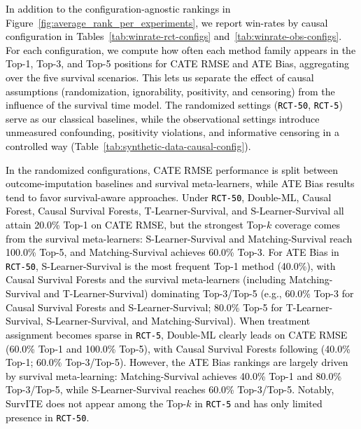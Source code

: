 \documentclass{article} %
\newcommand{\rebuttal}[1]{\textcolor{black}{#1}}
\begin{document}
\rebuttal{In addition to the configuration-agnostic rankings in Figure~\ref{fig:average_rank_per_experiments}, we report win-rates by causal configuration in Tables~\ref{tab:winrate-rct-configs} and~\ref{tab:winrate-obs-configs}. For each configuration, we compute how often each method family appears in the Top-1, Top-3, and Top-5 positions for CATE RMSE and ATE Bias, aggregating over the five survival scenarios. This lets us separate the effect of causal assumptions (randomization, ignorability, positivity, and censoring) from the influence of the survival time model. The randomized settings (\texttt{RCT-50}, \texttt{RCT-5}) serve as our classical baselines, while the observational settings introduce unmeasured confounding, positivity violations, and informative censoring in a controlled way (Table~\ref{tab:synthetic-data-causal-config}).}

\rebuttal{In the randomized configurations, CATE RMSE performance is split between outcome-imputation baselines and survival meta-learners, while ATE Bias results tend to favor survival-aware approaches. Under \texttt{RCT-50}, Double-ML, Causal Forest, Causal Survival Forests, T-Learner-Survival, and S-Learner-Survival all attain 20.0\% Top-1 on CATE RMSE, but the strongest Top-$k$ coverage comes from the survival meta-learners: S-Learner-Survival and Matching-Survival reach 100.0\% Top-5, and Matching-Survival achieves 60.0\% Top-3. For ATE Bias in \texttt{RCT-50}, S-Learner-Survival is the most frequent Top-1 method (40.0\%), with Causal Survival Forests and the survival meta-learners (including Matching-Survival and T-Learner-Survival) dominating Top-3/Top-5 (e.g., 60.0\% Top-3 for Causal Survival Forests and S-Learner-Survival; 80.0\% Top-5 for T-Learner-Survival, S-Learner-Survival, and Matching-Survival). When treatment assignment becomes sparse in \texttt{RCT-5}, Double-ML clearly leads on CATE RMSE (60.0\% Top-1 and 100.0\% Top-5), with Causal Survival Forests following (40.0\% Top-1; 60.0\% Top-3/Top-5). However, the ATE Bias rankings are largely driven by survival meta-learning: Matching-Survival achieves 40.0\% Top-1 and 80.0\% Top-3/Top-5, while S-Learner-Survival reaches 60.0\% Top-3/Top-5. Notably, SurvITE does not appear among the Top-$k$ in \texttt{RCT-5} and has only limited presence in \texttt{RCT-50}.}
\end{document}
